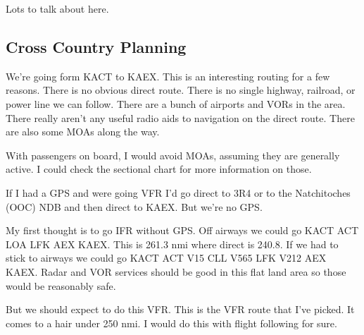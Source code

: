 Lots to talk about here.

\subsection{Cross Country Planning}

We're going form KACT to KAEX. This is an interesting routing for a few reasons. There is no obvious direct route. There is no single highway, railroad, or power line we can follow. There are a bunch of airports and VORs in the area. There really aren't any useful radio aids to navigation on the direct route. There are also some MOAs along the way.

With passengers on board, I would avoid MOAs, assuming they are generally active. I could check the sectional chart for more information on those.

If I had a GPS and were going VFR I'd go direct to 3R4 or to the Natchitoches (OOC) NDB and then direct to KAEX. But we're no GPS.

My first thought is to go IFR without GPS. Off airways we could go KACT ACT LOA LFK AEX KAEX. This is 261.3 nmi where direct is 240.8. If we had to stick to airways we could go KACT ACT V15 CLL V565 LFK V212 AEX KAEX. Radar and VOR services should be good in this flat land area so those would be reasonably safe.

But we should expect to do this VFR. This is the VFR route that I've picked. It comes to a hair under 250 nmi. I would do this with flight following for sure.

